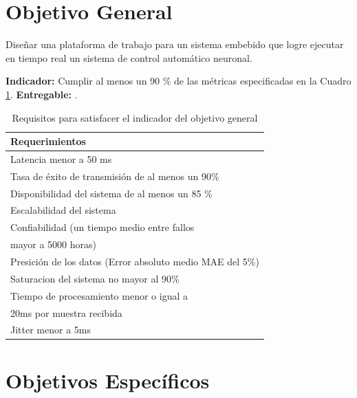 \documentclass[12pt]{article}
\begin{document}
\section{Objetivo General}

Diseñar una plataforma de trabajo para un sistema embebido que logre ejecutar en tiempo real un sistema de control automático neuronal.

\textbf{Indicador:} Cumplir al menos un 90 \% de las métricas especificadas en la Cuadro \ref{tab:obj_1}.\newline
\textbf{Entregable:} .


\begin{table}[!h]
  \centering
  \caption{Requisitos para satisfacer el indicador del objetivo general}
  \label{tab:obj_1}
  \begin{tabular}{|l|}
    \hline
    \rowcolor[HTML]{DAE8FC} 
    Requerimientos \\ \hline
    Latencia menor a 50 ms\\ \hline
    Tasa de éxito de transmisión de al menos un 90\%\\ \hline
    Disponibilidad del sistema de al menos un 85 \% \\ \hline
    Escalabilidad del sistema \\ \hline
    Confiabilidad (un tiempo medio entre fallos \\ mayor a 5000 horas) \\ \hline
    Presición de los datos (Error absoluto medio MAE del 5\%)\\ \hline
    Saturacion del sistema no mayor al 90\% \\ \hline
    Tiempo de procesamiento menor o igual a \\ 20ms por muestra recibida\\ \hline
    Jitter menor a 5ms \\ \hline
    \end{tabular}
\end{table}

\section{Objetivos Específicos}
\end{document}
